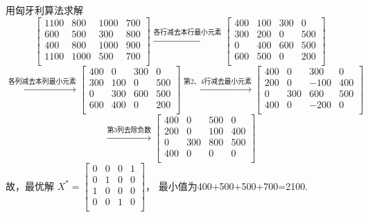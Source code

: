\begin{solution}
    用匈牙利算法求解
    $$\begin{bmatrix}
        1100& 800 & 1000& 700 \\
        600 & 500 & 300 & 800 \\
        400 & 800 & 1000& 900 \\
        1100& 1000& 500 & 700 \\
    \end{bmatrix}
    \xrightarrow{\text{各行减去本行最小元素}}
    \begin{bmatrix}
        400 & 100 & 300 & 0   \\
        300 & 200 & 0   & 500 \\
        0   & 400 & 600 & 500 \\
        600 & 500 & 0   & 200 \\
    \end{bmatrix}$$
    $$
    \xrightarrow{\text{各列减去本列最小元素}}
    \begin{bmatrix}
        400 & 0   & 300 & 0   \\
        300 & 100 & 0   & 500 \\
        0   & 300 & 600 & 500 \\
        600 & 400 & 0   & 200 \\
    \end{bmatrix}
    \xrightarrow{\text{第2、4行减去最小元素}}
    \begin{bmatrix}
        400 & 0   & 300 & 0   \\
        200 & 0   & -100& 400 \\
        0   & 300 & 600 & 500 \\
        400 & 0   & -200& 0   \\
    \end{bmatrix}$$
    $$
    \xrightarrow{\text{第3列去除负数}}
    \begin{bmatrix}
        400 & 0   & 500 & 0   \\
        200 & 0   & 100 & 400 \\
        0   & 300 & 800 & 500 \\
        400 & 0   & 0   & 0   \\
    \end{bmatrix}$$
    故，最优解
    $X^{*}=\begin{bmatrix}
        0  & 0  & 0  & 1  \\
        0  & 1  & 0  & 0  \\
        1  & 0  & 0  & 0  \\
        0  & 0  & 1  & 0  \\
    \end{bmatrix}$，
    最小值为400+500+500+700=2100.
\end{solution}
